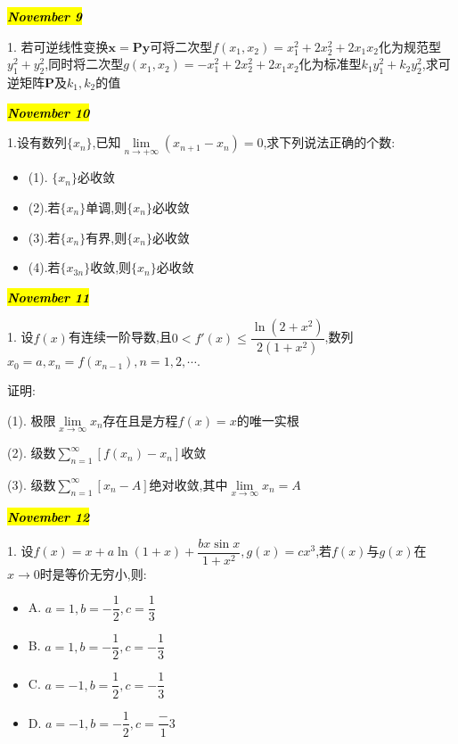 \hl{\textbf{\textit{November 9}}}

1. 若可逆线性变换$\mathbf{x=Py}$可将二次型$f(x_{1},x_{2})=x_{1}^{2}+2x_{2}^{2}+2x_{1}x_{2}$化为规范型$y_{1}^{2}+y_{2}^{2}$,同时将二次型$g(x_{1},x_{2})=-x_{1}^{2}+2x_{2}^{2}+2x_{1}x_{2}$化为标准型$k_{1}y_{1}^{2}+k_{2}y_{2}^{2}$,求可逆矩阵$\mathbf{P}$及$k_{1},k_{2}$的值
\begin{solution}
	
\end{solution}

\hl{\textbf{\textit{November 10}}}

1.设有数列$\{x_{n}\}$,已知$\lim\limits_{n\rightarrow +\infty}(x_{n+1}-x_{n})=0$,求下列说法正确的个数:
\begin{itemize}
	\item (1). $\{x_{n}\}$必收敛
	\item (2).若$\{x_{n}\}$单调,则$\{x_{n}\}$必收敛
	\item (3).若$\{x_{n}\}$有界,则$\{x_{n}\}$必收敛
	\item (4).若$\{x_{3n}\}$收敛,则$\{x_{n}\}$必收敛
\end{itemize}
\begin{solution}
	
\end{solution}

\hl{\textbf{\textit{November 11}}}

1. 设$f(x)$有连续一阶导数,且$0<f'(x)\leq\dfrac{\ln(2+x^{2})}{2(1+x^{2})}$,数列$x_{0}=a,x_{n}=f(x_{n-1}),n=1,2,\cdots .$

证明:

(1). 极限$\lim\limits_{x\rightarrow \infty}x_{n}$存在且是方程$f(x)=x$的唯一实根 

(2). 级数$\sum\limits_{n=1}^{\infty}\left[f(x_{n})-x_{n}\right]$收敛

(3). 级数$\sum\limits_{n=1}^{\infty}\left[x_{n}-A\right]$绝对收敛,其中$\lim\limits_{x\rightarrow\infty}x_{n}=A$
\begin{solution}
	
\end{solution}

\hl{\textbf{\textit{November 12}}}

1. 设$f(x)=x+a\ln(1+x)+\dfrac{bx\sin x}{1+x^{2}},g(x)=cx^{3}$,若$f(x)$与$g(x)$在$x\to 0$时是等价无穷小,则:
\begin{itemize}
	\item A. $a=1,b=-\dfrac{1}{2},c=\dfrac{1}{3}$ 
	\item B. $a=1,b=-\dfrac{1}{2},c=-\dfrac{1}{3}$
	\item C. $a=-1,b=\dfrac{1}{2},c=-\dfrac{1}{3}$
	\item D. $a=-1,b=-\dfrac{1}{2},c=\dfrac-{1}{3}$
\end{itemize}
\begin{solution}
	
\end{solution}


